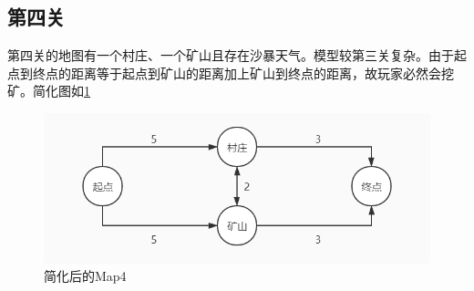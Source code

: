 \documentclass[withoutpre]{cumcmthesis} %
\begin{document}
\subsection{第四关}
第四关的地图有一个村庄、一个矿山且存在沙暴天气。模型较第三关复杂。由于起点到终点的距离等于起点到矿山的距离加上矿山到终点的距离，故玩家必然会挖矿。简化图如\cref{fig:map4}
\begin{figure}[H]
    \centering
    \includegraphics[scale=0.5]{figures/map4.jpg}
    \caption{简化后的Map4}
    \label{fig:map4}
\end{figure}
\end{document}

